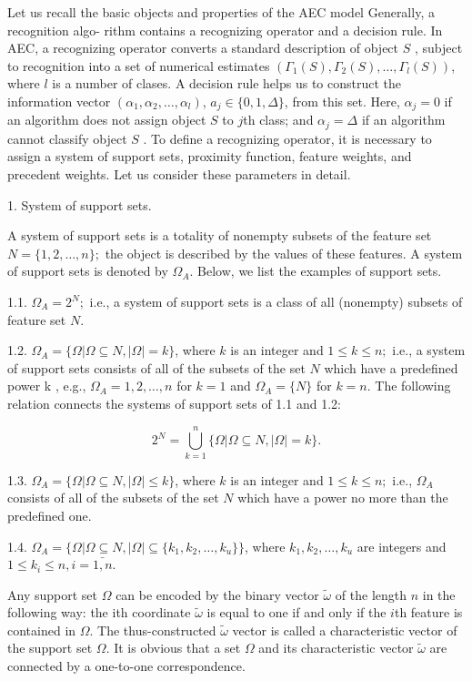Let us recall the basic objects and properties of the AEC model 
Generally, a recognition algo- rithm contains a recognizing operator and a 
decision rule. In AEC, a recognizing operator converts a standard 
description of object $S$ , subject to recognition into a 
set of numerical estimates $(\Gamma_1(S),\Gamma_2(S),\ldots,\Gamma_l(S))$,
where $l$ is a number of clases.  A decision rule helps us to 
construct the information vector $(\alpha_1,\alpha_2,\ldots,\alpha_l)$,
$a_j\in\{0,1,\Delta\}$, from this set.  Here, $\alpha_j  = 0$ if an algorithm does not
assign object  $S$ to $j$th class;  and  $\alpha_j  =  \Delta$ 
if an algorithm cannot classify object  $S$ . To define a recognizing operator, 
it is necessary to assign a system of support sets, proximity function, 
feature weights, and precedent weights. Let us consider these parameters in detail.  

1. System of support sets. 

A system of support sets is a totality of nonempty subsets of the feature set  
$N  = \{1,2,\ldots,n\};$ the object is described by the values of these features. 
A system of support sets is denoted by  $\Omega_A$. 
Below, we list the examples of support sets.

1.1. $\Omega_A  = 2^N;$ i.e., a system of support sets is a class of all (nonempty) 
subsets of feature set  $N$.
 
1.2.  $\Omega_A=\{\Omega|\Omega\subseteq N,|\Omega|=k\}$, where  $k$  is an integer and $1\leq k\leq n;$ 
i.e., a system of support sets consists of all of the subsets of the set  $N$  which have 
a predefined power  k , e.g.,  $\Omega_A={{1},{2},\ldots,{n}}$ for  $k=1$ and $\Omega_A=\{N\}$ for  $k=n$. 
The following relation connects the systems of support sets of 1.1 and 1.2:

$$
2^N=\bigcup_{k=1}^n\{\Omega | \Omega \subseteq N, | \Omega | = k\}.
$$

1.3. $\Omega_A=\{\Omega|\Omega\subseteq N,|\Omega|\leq k\}$, where  $k$  is an integer
and $1\leq k\leq n;$ i.e.,  $\Omega_A$ consists of all of the subsets of the
set $N$ which have a power no more than the predefined one. 

1.4. $\Omega_A=\{\Omega|\Omega\subseteq N,|\Omega|\subseteq \{k_1,k_2,\ldots,k_u\}\}$, where 
$k_1,k_2,\ldots,k_u$  are integers and $1\leq k_i \leq n, i=\bar{1,n}$. 

Any support set $\Omega$ 
can be encoded by the binary vector $\tilde{\omega}$ of the length $n$ in the following way: 
the ith coordinate $\tilde{\omega}$ is equal to one if and only if the $i$th feature is contained 
in $\Omega$. The thus-constructed $\tilde{\omega}$ vector is called a characteristic vector 
of the support set $\Omega$. It is obvious that a set $\Omega$ and its characteristic 
vector $\tilde{\omega}$ are connected by a one-to-one correspondence.

